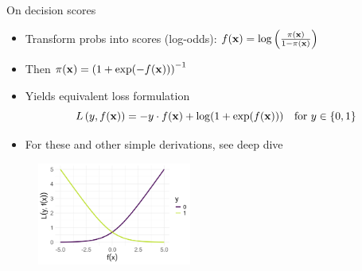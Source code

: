 \documentclass[11pt,compress,t,notes=noshow, xcolor=table]{beamer}
\begin{document}
\begin{vbframe}{On decision scores}

\begin{itemize}
    \item Transform probs into scores (log-odds): $f(\mathbf{x}) = \log\left(\frac{\pi(\mathbf{x})}{1 - \pi(\mathbf{x})}\right)$
    \item Then $\pi(\mathbf{x}) = \left(1 + \exp(-f(\mathbf{x}))\right)^{-1}$
    \item Yields equivalent loss formulation
$$L\left(y, f(\mathbf{x})\right) = - y \cdot f(\mathbf{x}) + \log(1 + \exp(f(\mathbf{x}))) \quad \text{for } y \in \{0, 1\}$$
    \item For these and other simple derivations, see deep dive
\end{itemize}

\vfill

\begin{center}
\begin{figure}
  \includegraphics[width=0.45\textwidth]{figure/bernoulli_logloss.png}\\
\end{figure}
\end{center}

\end{vbframe}
\end{document}
